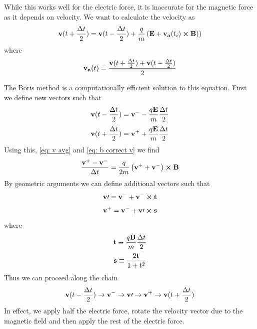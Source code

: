 \documentclass[twoside]{article}
\begin{document}
While this works well for the electric force, it is inaccurate for the magnetic force as it depends on velocity. We want to calculate the velocity as
\begin{equation} \label{eq: b correct v}
  \vb{v}(t+\frac{\Delta t}{2}) = \vb{v}(t-\frac{\Delta t}{2}) + \frac{q}{m} \left(\vb{E} + \vb{v_a}(t_i) \cp \vb{B})
    \right)
\end{equation}
where
\begin{equation} \label{eq: v avg}
  \vb{v_a}(t) = \frac{\vb{v}(t+\frac{\Delta t}{2})+\vb{v}(t-\frac{\Delta t}{2})}{2}
\end{equation}

The Boris method is a computationally efficient solution to this equation. First we define new vectors such that
\begin{equation} \label{eq: v minus}
  \vb{v}(t-\frac{\Delta t}{2}) = \vb{v^-} - \frac{q\vb{E}}{m}\frac{\Delta t}{2}
\end{equation}
\begin{equation} \label{eq: v plus}
  \vb{v}(t+\frac{\Delta t}{2}) = \vb{v^+} + \frac{q\vb{E}}{m}\frac{\Delta t}{2}
\end{equation}
Using this, \autoref{eq: v avg} and \autoref{eq: b correct v} we find
\begin{equation}
  \frac{\vb{v^+}-\vb{v^-}}{\Delta t} = \frac{q}{2m}\left(\vb{v^+}+\vb{v^-}\right)\cp\vb{B}
\end{equation}
By geometric arguments\cite{Birdsall1991} we can define additional vectors such that
\begin{equation}
  \vb{v\prime} = \vb{v^-} + \vb{v^-} \cp \vb{t}
\end{equation}
\begin{equation}
  \vb{v^+} = \vb{v^-} + \vb{v\prime} \cp \vb{s}
\end{equation}
where
\begin{equation}
  \vb{t} \equiv \frac{q\vb{B}}{m}\frac{\Delta t}{2}
\end{equation}
\begin{equation}
  \vb{s} \equiv \frac{2\vb{t}}{1+t^2}
\end{equation}
Thus we can proceed along the chain
\begin{equation} \label{eq: boris process}
  \vb{v}(t-\frac{\Delta t}{2}) \to
  \vb{v^-} \to
  \vb{v\prime} \to
  \vb{v^+} \to
  \vb{v}(t+\frac{\Delta t}{2})
\end{equation}
In effect, we apply half the electric force, rotate the velocity vector due to the magnetic field and then apply the rest of the electric force.\cite{vxbrotation}
\end{document}
